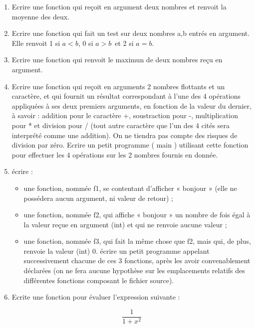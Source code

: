 \documentclass[a4paper, oneside,11pt]{book}
\begin{document}
\begin{enumerate}
\item Ecrire une fonction qui re\c{c}oit en argument deux nombres et renvoit la moyenne des deux.
\item Ecrire une fonction qui fait un test  sur deux nombres a,b entr\'es en argument. Elle renvoit 1 si $a < b$, 0 si $ a > b$\ et 2 si $a=b$. 
\item Ecrire une fonction qui renvoit le maximun de deux nombres re\c{c}u en argument.
\item Ecrire une fonction qui reçoit en arguments 2 nombres flottants et un caract\`ere, et qui fournit un r\'esultat
correspondant \`a l'une des 4 op\'erations appliqu\'ees \`a ses deux premiers arguments, en fonction de la
valeur du dernier, \`a savoir : addition pour le caract\`ere +, soustraction pour -, multiplication pour * et
division pour / (tout autre caract\`ere que l'un des 4 cit\'es sera interpr\'et\'e comme une addition). On ne
tiendra pas compte des risques de division par z\'ero.
Ecrire un petit programme ( main ) utilisant cette fonction pour effectuer les 4 op\'erations sur les 2
nombres fournis en donn\'ee.
\item \'ecrire :
\begin{itemize}
\item une fonction, nomm\'ee f1, se contentant d'afficher « bonjour » (elle ne poss\'edera aucun
argument, ni valeur de retour) ;
\item une fonction, nomm\'ee f2, qui affiche « bonjour » un nombre de fois \'egal \`a la valeur reçue en
argument (int) et qui ne renvoie aucune valeur ;
\item une fonction, nomm\'ee f3, qui fait la m\^eme chose que f2, mais qui, de plus, renvoie la valeur
(int) 0.
\'ecrire un petit programme appelant successivement chacune de ces 3 fonctions, apr\`es les avoir
convenablement d\'eclar\'ees (on ne fera aucune hypoth\`ese sur les emplacements relatifs des diff\'erentes
fonctions composant le fichier source).
\end{itemize}

\item Ecrite une fonction pour \'evaluer l'expression suivante :

\begin{equation*}
\frac{1}{1+x^2}
\end{equation*}
\end{enumerate}


\end{document}
